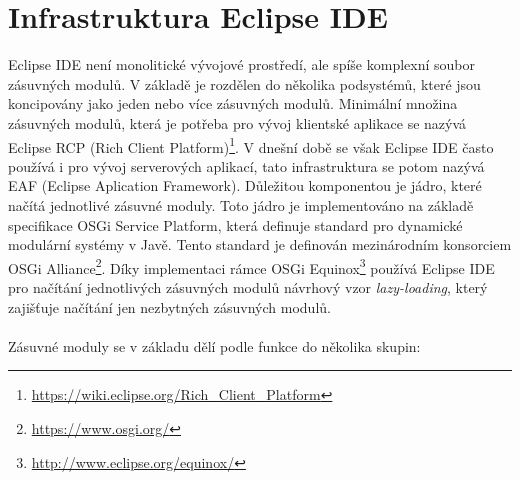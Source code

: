   \section{Infrastruktura Eclipse IDE}%
  Eclipse IDE není monolitické vývojové prostředí, ale spíše komplexní soubor zásuvných modulů. V základě je rozdělen do několika podsystémů, které jsou koncipovány jako jeden nebo více zásuvných modulů. Minimální množina zásuvných modulů, která je potřeba pro vývoj klientské aplikace se nazývá Eclipse RCP (Rich Client Platform)\footnote{\url{https://wiki.eclipse.org/Rich_Client_Platform}}. V dnešní době se však Eclipse IDE často používá i pro vývoj serverových aplikací, tato infrastruktura se potom nazývá EAF (Eclipse Aplication Framework). Důležitou komponentou je jádro, které načítá jednotlivé zásuvné moduly. Toto jádro je implementováno na základě specifikace OSGi Service Platform, která definuje standard pro dynamické modulární systémy v Javě\cite{Plugins}. Tento standard je definován mezinárodním konsorciem OSGi Alliance\footnote{\url{https://www.osgi.org/}}. Díky implementaci rámce OSGi Equinox\footnote{\url{http://www.eclipse.org/equinox/}} používá Eclipse IDE pro načítání jednotlivých zásuvných modulů návrhový vzor \emph{lazy-loading}, který zajišťuje načítání jen nezbytných zásuvných modulů.
  \\
  \\
  \noindent Zásuvné moduly se v základu dělí podle funkce do několika skupin:
